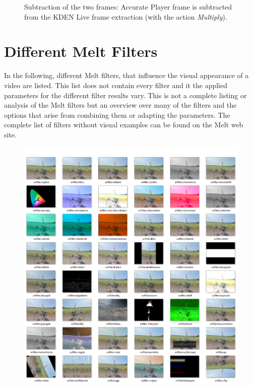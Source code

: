 \documentclass[../MasterThesis.tex]{subfiles}
\begin{document}
\vspace*{-1em}

\begin{figure}[H]
	\begin{center}
		\caption[]{Subtraction of the two frames: Accurate Player frame is subtracted from the KDEN Live frame extraction (with the action \textit{Multiply}).}
	\end{center}
\end{figure}









\newpage
\section{Different Melt Filters} \label{appendix:differentMeltFilter}

In the following, different Melt filters, that influence the visual appearance of a video are listed. This list does not contain every filter and it the applied parameters for the different filter results vary. This is not a complete listing or analysis of the Melt filters but an overview over many of the filters and the options that arise from combining them or adapting the parameters. The complete list of filters without visual examples can be found on the Melt web site.~\cite{melt_filters}
%
\begin{figure}[H]
	\includegraphics[width=1\textwidth]{Seite1.png}
\end{figure}
\end{document}
